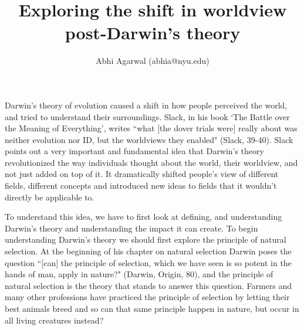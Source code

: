 \documentclass[11pt, oneside]{article}
\title{Exploring the shift in worldview post-Darwin's theory}
\author{Abhi Agarwal (abhia@nyu.edu)}
\date{}
\begin{document}
\maketitle



\par Darwin's theory of evolution caused a shift in how people perceived the world, and tried to understand their surroundings. Slack, in his book `The Battle over the Meaning of Everything', writes ``what [the dover trials were] really about was neither evolution nor ID, but the worldviews they enabled" (Slack, 39-40). Slack points out a very important and fundamental idea that Darwin's theory revolutionized the way individuals thought about the world, their worldview, and not just added on top of it. It dramatically shifted people's view of different fields, different concepts and introduced new ideas to fields that it wouldn't directly be applicable to.


\par To understand this idea, we have to first look at defining, and understanding Darwin's theory and understanding the impact it can create. To begin understanding Darwin's theory we should first explore the principle of natural selection. At the beginning of his chapter on natural selection Darwin poses the question ``[can] the principle of selection, which we have seen is so potent in the hands of man, apply in nature?" (Darwin, Origin, 80), and the principle of natural selection is the theory that stands to answer this question. Farmers and many other professions have practiced the principle of selection by letting their best animals breed and so can that same principle happen in nature, but occur in all living creatures instead? 
\end{document}
